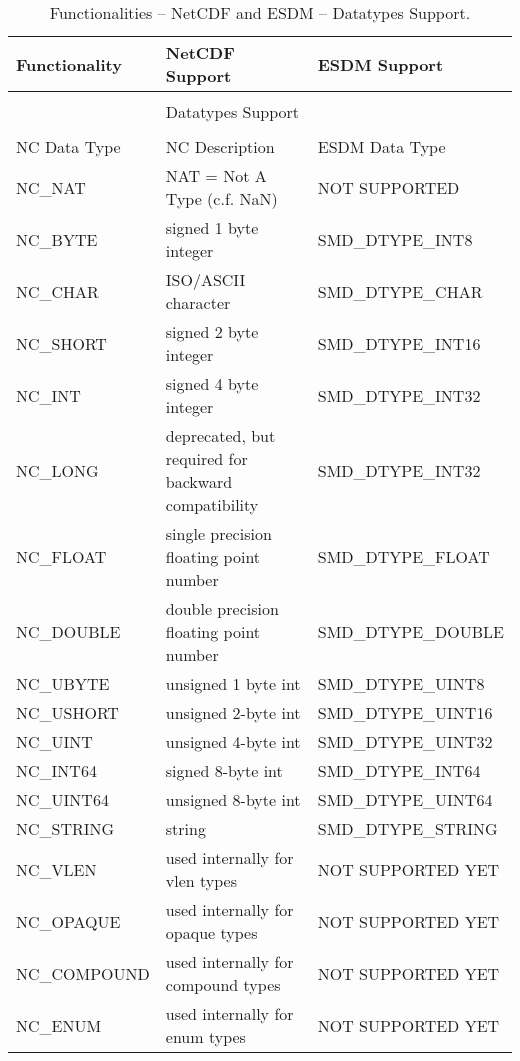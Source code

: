 \begin{table}[H]
\centering
\begin{tabular}{|l|m{6cm}|l|}
\hline
Functionality & NetCDF Support & ESDM Support \\ \hline \hline

& & \\
& \large{Datatypes Support} & \\
& & \\ \hline \hline

NC Data Type  &  NC Description  & ESDM Data Type  \\ \hline

NC\_NAT & NAT = Not A Type (c.f. NaN) &     NOT SUPPORTED        \\ \hline
NC\_BYTE & signed 1 byte integer &     SMD\_DTYPE\_INT8        \\ \hline
NC\_CHAR & ISO/ASCII character &      SMD\_DTYPE\_CHAR       \\ \hline
NC\_SHORT & signed 2 byte integer &   SMD\_DTYPE\_INT16          \\ \hline
NC\_INT & signed 4 byte integer &     SMD\_DTYPE\_INT32        \\ \hline
NC\_LONG & deprecated, but required for backward compatibility &    SMD\_DTYPE\_INT32         \\ \hline
NC\_FLOAT & single precision floating point number &   SMD\_DTYPE\_FLOAT           \\ \hline
NC\_DOUBLE & double precision floating point number &   SMD\_DTYPE\_DOUBLE          \\ \hline
NC\_UBYTE & unsigned 1 byte int &     SMD\_DTYPE\_UINT8        \\ \hline
NC\_USHORT & unsigned 2-byte int &    SMD\_DTYPE\_UINT16         \\ \hline
NC\_UINT & unsigned 4-byte int &   SMD\_DTYPE\_UINT32          \\ \hline
NC\_INT64 & signed 8-byte int &    SMD\_DTYPE\_INT64         \\ \hline
NC\_UINT64 & unsigned 8-byte int &    SMD\_DTYPE\_UINT64         \\ \hline
NC\_STRING & string &    SMD\_DTYPE\_STRING         \\ \hline
NC\_VLEN & used internally for vlen types &      NOT SUPPORTED YET       \\ \hline
NC\_OPAQUE & used internally for opaque types &     NOT SUPPORTED YET        \\ \hline
NC\_COMPOUND & used internally for compound types &    NOT SUPPORTED YET         \\ \hline
NC\_ENUM & used internally for enum types &       NOT SUPPORTED YET      \\ \hline \hline
\end{tabular}
\caption{Functionalities -- NetCDF and ESDM -- Datatypes Support.}
\end{table}

